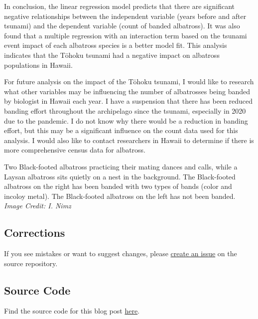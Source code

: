 \documentclass[
]{article}
\begin{document}
In conclusion, the linear regression model predicts that there are
significant negative relationships between the independent variable
(years before and after tsunami) and the dependent variable (count of
banded albatross). It was also found that a multiple regression with an
interaction term based on the tsunami event impact of each albatross
species is a better model fit. This analysis indicates that the Tōhoku
tsunami had a negative impact on albatross populations in Hawaii.

For future analysis on the impact of the Tōhoku tsunami, I would like to
research what other variables may be influencing the number of
albatrosses being banded by biologist in Hawaii each year. I have a
suspension that there has been reduced banding effort throughout the
archipelago since the tsunami, especially in 2020 due to the pandemic. I
do not know why there would be a reduction in banding effort, but this
may be a significant influence on the count data used for this analysis.
I would also like to contact researchers in Hawaii to determine if there
is more comprehensive census data for albatross.

Two Black-footed albatross practicing their mating dances and calls,
while a Laysan albatross sits quietly on a nest in the background. The
Black-footed albatross on the right has been banded with two types of
bands (color and incoloy metal). The Black-footed albatross on the left
has not been banded. \emph{Image Credit: I. Nimz}

\hypertarget{corrections}{%
\subsection{Corrections}\label{corrections}}

If you see mistakes or want to suggest changes, please
\href{https://github.com/juliaparish/juliaparish.github.io/issues}{create
an issue} on the source repository.

\hypertarget{source-code}{%
\subsection{Source Code}\label{source-code}}

Find the source code for this blog post
\href{https://github.com/juliaparish/eds222_final}{here}.
\end{document}
